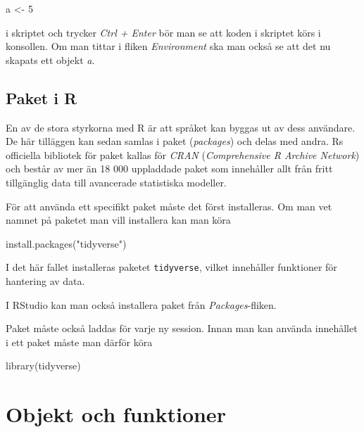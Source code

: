 \documentclass[
]{book}
\newenvironment{Shaded}{\begin{snugshade}}{\end{snugshade}}
\newcommand{\DecValTok}[1]{\textcolor[rgb]{0.00,0.00,0.81}{#1}}
\newcommand{\FunctionTok}[1]{\textcolor[rgb]{0.00,0.00,0.00}{#1}}
\newcommand{\NormalTok}[1]{#1}
\newcommand{\OtherTok}[1]{\textcolor[rgb]{0.56,0.35,0.01}{#1}}
\newcommand{\StringTok}[1]{\textcolor[rgb]{0.31,0.60,0.02}{#1}}
\theoremstyle{definition}
\theoremstyle{definition}
\theoremstyle{definition}
\theoremstyle{definition}
\theoremstyle{remark}
\begin{document}
\begin{Shaded}
\begin{Highlighting}[]
\NormalTok{a }\OtherTok{\textless{}{-}} \DecValTok{5}
\end{Highlighting}
\end{Shaded}

i skriptet och trycker \emph{Ctrl + Enter} bör man se att koden i skriptet körs i konsollen. Om man tittar i fliken \emph{Environment} ska man också se att det nu skapats ett objekt \emph{a}.

\hypertarget{paket-i-r}{%
\section{Paket i R}\label{paket-i-r}}

En av de stora styrkorna med R är att språket kan byggas ut av dess användare. De här tilläggen kan sedan samlas i paket (\emph{packages}) och delas med andra. Rs officiella bibliotek för paket kallas för \emph{CRAN} (\emph{Comprehensive R Archive Network}) och består av mer än 18 000 uppladdade paket som innehåller allt från fritt tillgänglig data till avancerade statistiska modeller.

För att använda ett specifikt paket måste det först installeras. Om man vet namnet på paketet man vill installera kan man köra

\begin{Shaded}
\begin{Highlighting}[]
\FunctionTok{install.packages}\NormalTok{(}\StringTok{"tidyverse"}\NormalTok{)}
\end{Highlighting}
\end{Shaded}

I det här fallet installeras paketet \texttt{tidyverse}, vilket innehåller funktioner för hantering av data.

I RStudio kan man också installera paket från \emph{Packages}-fliken.

Paket måste också laddas för varje ny session. Innan man kan använda innehållet i ett paket måste man därför köra

\begin{Shaded}
\begin{Highlighting}[]
\FunctionTok{library}\NormalTok{(tidyverse)}
\end{Highlighting}
\end{Shaded}

\hypertarget{objekt-och-funktioner}{%
\chapter{Objekt och funktioner}\label{objekt-och-funktioner}}
\end{document}
